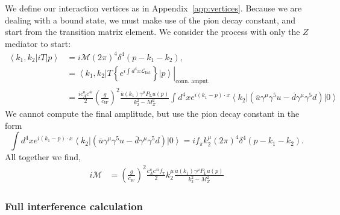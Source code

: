 \documentclass[11pt, a4paper]{article}
\newcommand{\refapp}[1]{Appendix~\ref{#1}}
\begin{document}
We define our interaction vertices as in \refapp{app:vertices}.
%
Because we are dealing with a bound state, we must make use of the pion decay constant, and start from the transition matrix element. We consider the process with only the $Z$ mediator to start:
%
\begin{align*}   \left\langle k_1, k_2\right| iT \left|p\right\rangle &= i\mathcal{M}(2\pi)^4\delta^4(p-k_1-k_2), \\
%
&= \left.\left\langle k_1,k_2\right|T\left\{e^{i\int d^4x \mathcal{L}_\text{Int}} \right\} \left|p\right\rangle\right|_\text{conn. amput.}\\
%
&= \frac{ic^u_Ac^{4i}}{2}\left(\frac{g}{c_W}\right)^2 \frac{\overline{u}(k_1) \gamma^\mu P_\text{L} u(p)}{k_2^2-M_Z^2}\int d^4x e^{i(k_1-p)\cdot x} \left\langle k_2\right| \left(\overline{u}\gamma^\mu\gamma^5u - \overline{d}\gamma^\mu\gamma^5d\right)\left|0\right\rangle 
%
\end{align*}
%
We cannot compute the final amplitude, but use the pion decay constant in the form  
%
\[ \int d^4x e^{i(k_1-p)\cdot x}  \left\langle k_2\right| \left(\overline{u}\gamma^\mu\gamma^5u - \overline{d}\gamma^\mu\gamma^5d\right)\left|0\right\rangle = if_\pi k_2^\mu (2\pi)^4\delta^4(p-k_1-k_2).  \]
%
All together we find, 
%
\begin{align*}
%
i\mathcal{M} &= \left(\frac{g}{c_W}\right)^2\frac{c^u_A c^{4i} f_\pi }{2} k_2^\mu\frac{\overline{u}(k_1) \gamma^\mu P_\text{L} u(p)}{k_2^2-M_Z^2}
%
\end{align*}

\subsubsection{Full interference calculation}
\end{document}
